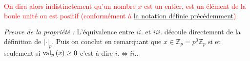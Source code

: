 \textcolor{red}{ On dira alors indistinctement qu'un nombre $x$ est un entier, est un élément de la boule unité ou est positif (conformément à \hyperlink{positif}{la notation définie précédemment}).}

\textit{ Preuve de la propriété : } L'équivalence entre $ii$. et $iii$. découle directement de la définition de $\left| \cdot  \right|_p$. Puis on conclut en remarquant que $x \in \mathbb{Z}_p = p^0 \mathbb{Z}_p$ si et seulement si $\text{val}_p\left(x\right)\ge 0$ c'est-à-dire $i. \iff ii.$.
